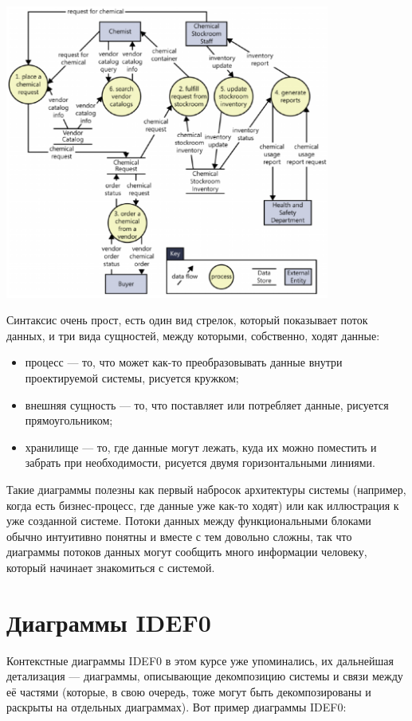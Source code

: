 \documentclass{../mcstext}
\begin{document}
\begin{center}
    \includegraphics[width=0.8\textwidth]{dfd.png}
\end{center}

Синтаксис очень прост, есть один вид стрелок, который показывает поток данных, и три вида сущностей, между которыми, собственно, ходят данные:

\begin{itemize}
    \item процесс --- то, что может как-то преобразовывать данные внутри проектируемой системы, рисуется кружком;
    \item внешняя сущность --- то, что поставляет или потребляет данные, рисуется прямоугольником;
    \item хранилище --- то, где данные могут лежать, куда их можно поместить и забрать при необходимости, рисуется двумя горизонтальными линиями.
\end{itemize}

Такие диаграммы полезны как первый набросок архитектуры системы (например, когда есть бизнес-процесс, где данные уже как-то ходят) или как иллюстрация к уже созданной системе. Потоки данных между функциональными блоками обычно интуитивно понятны и вместе с тем довольно сложны, так что диаграммы потоков данных могут сообщить много информации человеку, который начинает знакомиться с системой.

\section{Диаграммы IDEF0}

Контекстные диаграммы IDEF0 в этом курсе уже упоминались, их дальнейшая детализация --- диаграммы, описывающие декомпозицию системы и связи между её частями (которые, в свою очередь, тоже могут быть декомпозированы и раскрыты на отдельных диаграммах). Вот пример диаграммы IDEF0:
\end{document}
